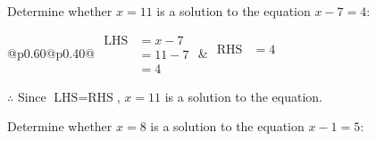 \documentclass[12pt]{article}
\newcounter{minipagecount}
\begin{document}
\begin{multicols}{2}
\begin{minipage}[t]{0.40\textwidth}
    \noindent Determine whether \(x = 11\) is a solution to the equation \(x - 7 = 4\):
    \vspace{4pt}  %

    \noindent
    \renewcommand{\arraystretch}{1.3} %
    \begin{tabular}{@{}p{0.60\linewidth}@{}p{0.40\linewidth}@{}}
        \(\begin{aligned}
            \text{LHS} &= x - 7 \\
                    &= 11 - 7 \\
                    &= 4
        \end{aligned}\) &
        \(\begin{aligned}
            \text{RHS} &= 4\\
                    & \\
                    &
        \end{aligned}\)
    \end{tabular}
    \renewcommand{\arraystretch}{1.0} %
    \vspace{2pt}  %

    \noindent \(\therefore\) Since \(\text{LHS} = \text{RHS}\), \(x = 11\) is  a solution to the equation.

\end{minipage}

 \vspace*{16pt}
\newpage
\noindent{(\theminipagecount)}\hspace{0.1mm} %
\begin{minipage}[t]{0.40\textwidth} %

    \noindent Determine whether \(x = 8\) is a solution to the equation \(x - 1 = 5\):
    \vspace{4pt}  %


\end{minipage}
\end{multicols}
\end{document}
